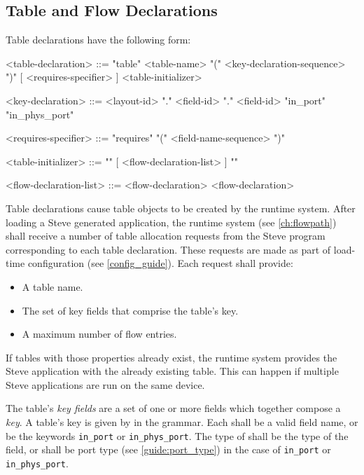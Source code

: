 \subsection{Table and Flow Declarations} \label{guide:tables}

Table declarations have the following form:

\begin{minip}
\begin{grammar}
<table-declaration> ::=
"table" <table-name> "(" <key-declaration-sequence> ")"
[ <requires-specifier> ] <table-initializer>

<key-declaration> ::=
<layout-id> "." <field-id>
 "." <field-id>
\alt "in_port"
\alt "in\_phys\_port"

<requires-specifier> ::=
"requires" "(" <field-name-sequence> ")"

<table-initializer> ::= "{" [ <flow-declaration-list> ] "}"

<flow-declaration-list> ::= <flow-declaration>
 <flow-declaration>
\end{grammar}
\end{minip}

Table declarations cause table objects to be created by the runtime system. After loading a Steve generated application, the runtime system (see \ref{ch:flowpath}) shall receive a number of table allocation requests from the Steve program corresponding to each table declaration. These requests are made as part of load-time configuration (see \ref{config_guide}). Each request shall provide:

\begin{itemize}
\item A table name.
\item The set of key fields that comprise the table's key.
\item A maximum number of flow entries.
\end{itemize}

If tables with those properties already exist, the runtime system provides the Steve application with the already existing table. This can happen if multiple Steve applications are run on the same device.

The table's \textit{key fields} are a set of one or more fields which together compose a \textit{key}. A table's key is given by  in the grammar. Each  shall be a valid field name, or be the keywords \texttt{in\_port} or \texttt{in\_phys\_port}. The type of  shall be the type of the field, or shall be port type (see \ref{guide:port_type}) in the case of \texttt{in\_port} or \texttt{in\_phys\_port}.

